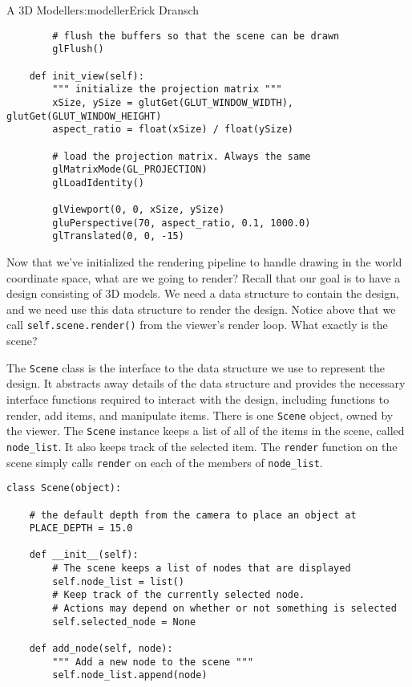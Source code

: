 \begin{aosachapter}{A 3D Modeller}{s:modeller}{Erick Dransch}
\begin{verbatim}
        # flush the buffers so that the scene can be drawn
        glFlush()

    def init_view(self):
        """ initialize the projection matrix """
        xSize, ySize = glutGet(GLUT_WINDOW_WIDTH), glutGet(GLUT_WINDOW_HEIGHT)
        aspect_ratio = float(xSize) / float(ySize)

        # load the projection matrix. Always the same
        glMatrixMode(GL_PROJECTION)
        glLoadIdentity()

        glViewport(0, 0, xSize, ySize)
        gluPerspective(70, aspect_ratio, 0.1, 1000.0)
        glTranslated(0, 0, -15)
\end{verbatim}

\label{what-to-render-the-scene}

Now that we've initialized the rendering pipeline to handle drawing in
the world coordinate space, what are we going to render? Recall that our
goal is to have a design consisting of 3D models. We need a data
structure to contain the design, and we need use this data structure to
render the design. Notice above that we call
\texttt{self.scene.render()} from the viewer's render loop. What exactly
is the scene?

The \texttt{Scene} class is the interface to the data structure we use
to represent the design. It abstracts away details of the data structure
and provides the necessary interface functions required to interact with
the design, including functions to render, add items, and manipulate
items. There is one \texttt{Scene} object, owned by the viewer. The
\texttt{Scene} instance keeps a list of all of the items in the scene,
called \texttt{node\_list}. It also keeps track of the selected item.
The \texttt{render} function on the scene simply calls \texttt{render}
on each of the members of \texttt{node\_list}.

\begin{verbatim}
class Scene(object):

    # the default depth from the camera to place an object at
    PLACE_DEPTH = 15.0

    def __init__(self):
        # The scene keeps a list of nodes that are displayed
        self.node_list = list()
        # Keep track of the currently selected node.
        # Actions may depend on whether or not something is selected
        self.selected_node = None

    def add_node(self, node):
        """ Add a new node to the scene """
        self.node_list.append(node)


\end{verbatim}
\end{aosachapter}
